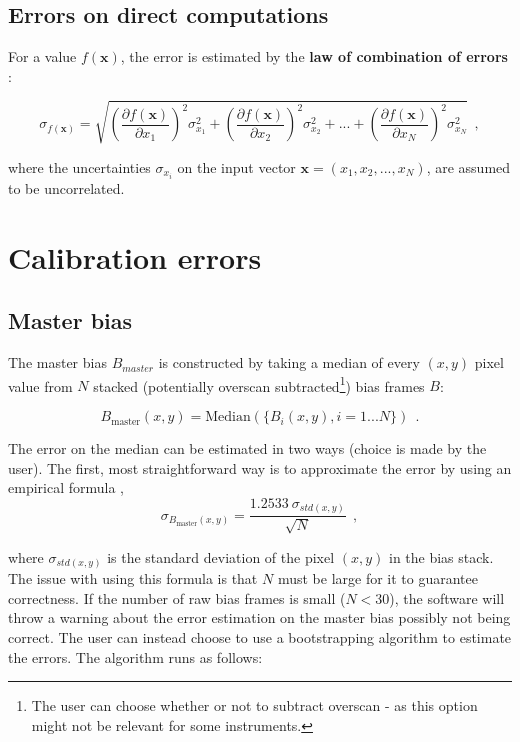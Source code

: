 \documentclass{article}
\begin{document}
\subsection{Errors on direct computations}

For a value $f(\textbf{x})$, the error is estimated by the \textbf{law of combination of errors} \cite[eq. 4.14]{barlow1995statistics}: 

\begin{equation}\label{combination}
    \sigma_{f(\textbf{x})} = \sqrt{\left(\frac{\partial f(\textbf{x})}{\partial x_{1}}\right)^2 \sigma_{x_1}^2 + \left(\frac{\partial f(\textbf{x})}{\partial x_{2}}\right)^2 \sigma_{x_2}^2 + ... + \left(\frac{\partial f(\textbf{x})}{\partial x_{N}}\right)^2 \sigma_{x_N}^2} \ \ ,
\end{equation}

\noindent where the uncertainties $\sigma_{x_{i}}$ on the input vector $\textbf{x} = (x_{1}, x_{2}, ..., x_{N} )$, are assumed to be uncorrelated.

\section{Calibration errors}

\subsection{Master bias}\label{master bias}

The master bias $B_{master}$ is constructed by taking a median of every $(x,y)$ pixel value from $N$ stacked (potentially overscan subtracted\footnote{The user can choose whether or not to subtract overscan - as this option might not be relevant for some instruments.}) bias frames $B$:

\begin{equation}\label{bias_eq}
    B_{\text{master}}(x,y) = \text{Median}(\{B_{i}(x,y), i = 1 ... N\}) \ \ .
\end{equation}

\noindent The error on the median can be estimated in two ways (choice is made by the user). The first, most straightforward way is to approximate the error by using an empirical formula \cite[ch. 9.2]{Wackerly2007-dp},
\begin{equation}
    \sigma_{B_{\text{master}}(x,y)} = \frac{1.2533 \ \sigma_{std(x,y)}}{\sqrt{N}} \ \ ,
\end{equation}

\noindent where $\sigma_{std(x,y)}$ is the standard deviation of the pixel $(x,y)$ in the bias stack. The issue with using this formula is that $N$ must be large for it to guarantee correctness. If the number of raw bias frames is small ($N < 30$), the software will throw a warning about the error estimation on the master bias possibly not being correct. The user can instead choose to use a bootstrapping algorithm to estimate the errors. The algorithm runs as follows:
\end{document}
